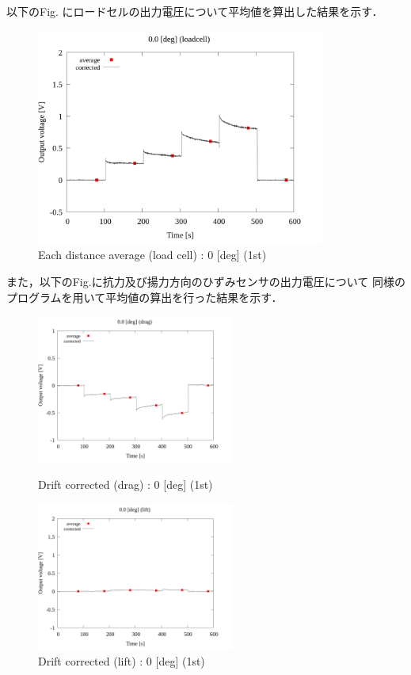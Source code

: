 以下のFig. にロードセルの出力電圧について平均値を算出した結果を示す．

\begin{figure}[htbp]
	\footnotesize
	\begin{center}
		\includegraphics[width=95mm]{../../02_workspace/result/2-1/plot/03-1_loadcell/03_loadcell_average_0.png}
		\caption{Each distance average (load cell) : 0 [deg] (1st)}
	\end{center}
\end{figure}

また，以下のFig.に抗力及び揚力方向のひずみセンサの出力電圧について
同様のプログラムを用いて平均値の算出を行った結果を示す．

\begin{figure}[htbp]
	\begin{minipage}[b]{0.45\linewidth}
		\centering
		\includegraphics[width=65mm]{../../02_workspace/result/2-1/plot/03-2_drag/03_drag_average_0.png}
		\caption{Drift corrected (drag) : 0 [deg] (1st)}
	\end{minipage}
	\begin{minipage}[b]{0.45\linewidth}
		\centering
		\includegraphics[width=65mm]{../../02_workspace/result/2-1/plot/03-3_lift/03_lift_average_0.png}
		\caption{Drift corrected (lift) : 0 [deg] (1st)}
	\end{minipage}
\end{figure}

